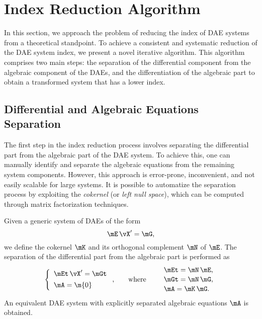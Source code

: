 \section{Index Reduction Algorithm}
\label{chap6:sec:algorithm}

In this section, we approach the problem of reducing the index of \ac{DAE} systems from a theoretical standpoint. To achieve a consistent and systematic reduction of the \ac{DAE} system index, we present a novel iterative algorithm. This algorithm comprises two main steps: the separation of the differential component from the algebraic component of the \acp{DAE}, and the differentiation of the algebraic part to obtain a transformed system that has a lower index.

\subsection{Differential and Algebraic Equations Separation}

The first step in the index reduction process involves separating the differential part from the algebraic part of the \ac{DAE} system. To achieve this, one can manually identify and separate the algebraic equations from the remaining system components. However, this approach is error-prone, inconvenient, and not easily scalable for large systems. It is possible to automatize the separation process by exploiting the \emph{cokernel} (or \emph{left null space}), which can be computed through matrix factorization techniques.

Given a generic system of \acp{DAE} of the form
%
\begin{equation}
    \label{chap6:eq:daes}
    \mE \, \vX^\prime = \mG \text{,}
\end{equation}
%
we define the cokernel $\mK$ and its orthogonal complement $\mN$ of $\mE$. The separation of the differential part from the algebraic part is performed as
%
\begin{equation}
    \label{chap6:eq:separated_daes}
    \left\{\begin{array}{l}
        \mEt \, \vX^\prime = \mGt \\[0.4em]
        \mA = \m{0}
    \end{array}\right. \text{,}
    \qquad \text{where} \qquad
    \begin{array}{l}
        \mEt = \mN \, \mE \text{,} \\[0.5mm]
        \mGt = \mN \, \mG \text{,} \\[0.5mm]
        \mA  = \mK \, \mG \text{.}
    \end{array}
\end{equation}
%
An equivalent \ac{DAE} system with explicitly separated algebraic equations $\mA$ is obtained.

